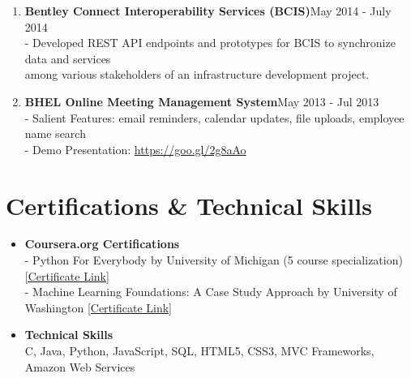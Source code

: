 \documentclass{article}
\begin{document}
\begin{enumerate}
    \item \textbf{Bentley Connect Interoperability Services (BCIS)}{\hfill May 2014 - July 2014}\\
    - Developed REST API endpoints and prototypes for BCIS to synchronize data and services\\
    \hspace*{0.7em}among various stakeholders of an infrastructure development project.
    
    \item \textbf{BHEL Online Meeting Management System}{\hfill May 2013 - Jul 2013}\\
    - Salient Features: email reminders, calendar updates, file uploads, employee name search\\
    - Demo Presentation: \href{https://goo.gl/2g8aAo}{https://goo.gl/2g8aAo}

\end{enumerate}


\section*{Certifications \& Technical Skills}
\begin{itemize}
    \item \textbf{Coursera.org Certifications}\\
    - Python For Everybody by University of Michigan (5 course specialization) \href{https://www.coursera.org/account/accomplishments/specialization/2B5PCJGZ9WEE}{[Certificate Link]}\\
    - Machine Learning Foundations: A Case Study Approach by University of Washington \href{https://www.coursera.org/account/accomplishments/certificate/NDVXWMCYKX9N}{[Certificate Link]}
    
    \item \textbf{Technical Skills}\\
    C, Java, Python, JavaScript, SQL, HTML5, CSS3, MVC Frameworks, Amazon Web Services
\end{itemize}
\end{document}
